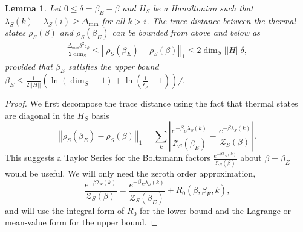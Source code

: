 \documentclass{article}
\newtheorem{lemma}[theorem]{Lemma}
\newcommand{\parens}[1]{\left( #1 \right)}
\newcommand{\abs}[1]{\left| #1 \right|}
\newcommand{\norm}[1]{\left| \left| #1 \right| \right|}
\newcommand{\partfun}{\mathcal{Z}}
\begin{document}
\begin{lemma} \label{lem:thermal_state_diff_bound}
    Let $0 \leq \delta = \beta_E - \beta$ and $H_S$ be a Hamiltonian such that $\lambda_S(k) - \lambda_S(i) \geq \Delta_{\min}$ for all $k > i$. The trace distance between the thermal states $\rho_S(\beta)$ and $\rho_S(\beta_E)$ can be bounded from above and below as
    \begin{align}
        \frac{\Delta_{\min} \delta^2 \epsilon_{\rho}}{2 \dim_S} \leq \norm{\rho_S(\beta_E) - \rho_S(\beta)}_1 \leq 2 \dim_S \norm{H} \delta,
    \end{align}
    provided that $\beta_E$ satisfies the upper bound $\beta_E \leq \frac{1}{2 \norm{H}} \parens{\ln (\dim_S - 1) + \ln \left( \frac{1}{\epsilon_{\rho}} - 1\right) }$/. 
\end{lemma}
\begin{proof}
    We first decompose the trace distance using the fact that thermal states are diagonal in the $H_S$ basis
    \begin{equation}
        \norm{\rho_S(\beta_E) - \rho_S(\beta)}_1 = \sum_k \abs{\frac{e^{-\beta_E \lambda_S(k)}}{\partfun_S(\beta_E)} - \frac{e^{-\beta \lambda_S(k)}}{\partfun_S(\beta)}}. \label{eq:thermal_diffs_1}
    \end{equation}
    This suggests a Taylor Series for the Boltzmann factors $\frac{e^{-\beta \lambda_S(k)}}{\partfun_S(\beta)}$ about $\beta = \beta_E$ would be useful. We will only need the zeroth order approximation,
    \begin{equation}
        \frac{e^{-\beta \lambda_S(k)}}{\partfun_S(\beta)} = \frac{e^{-\beta_E \lambda_S(k)}}{\partfun_S(\beta_E)} + R_0(\beta, \beta_E, k),
    \end{equation}
    and will use the integral form of $R_0$ for the lower bound and the Lagrange or mean-value form for the upper bound. 
    

\end{proof}
\end{document}
